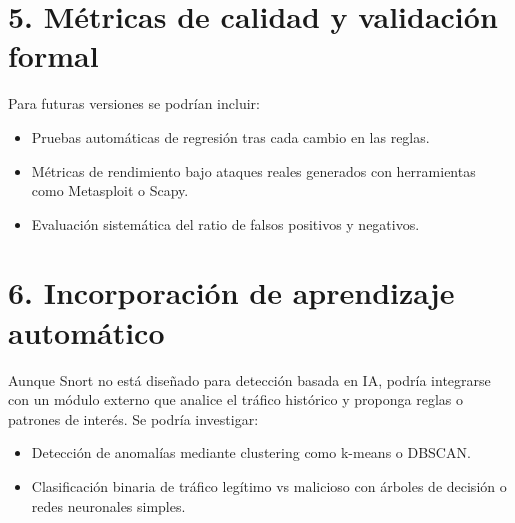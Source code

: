 \documentclass[11pt,a4paper,twoside]{report}
\begin{document}
\section*{5. Métricas de calidad y validación formal}

Para futuras versiones se podrían incluir:

\begin{itemize}
	\item Pruebas automáticas de regresión tras cada cambio en las reglas.
	\item Métricas de rendimiento bajo ataques reales generados con herramientas como Metasploit o Scapy.
	\item Evaluación sistemática del ratio de falsos positivos y negativos.
\end{itemize}

\section*{6. Incorporación de aprendizaje automático}

Aunque Snort no está diseñado para detección basada en IA, podría integrarse con un módulo externo que analice el tráfico histórico y proponga reglas o patrones de interés. Se podría investigar:

\begin{itemize}
	\item Detección de anomalías mediante clustering como k-means o DBSCAN.
	\item Clasificación binaria de tráfico legítimo vs malicioso con árboles de decisión o redes neuronales simples.
\end{itemize}
\end{document}
